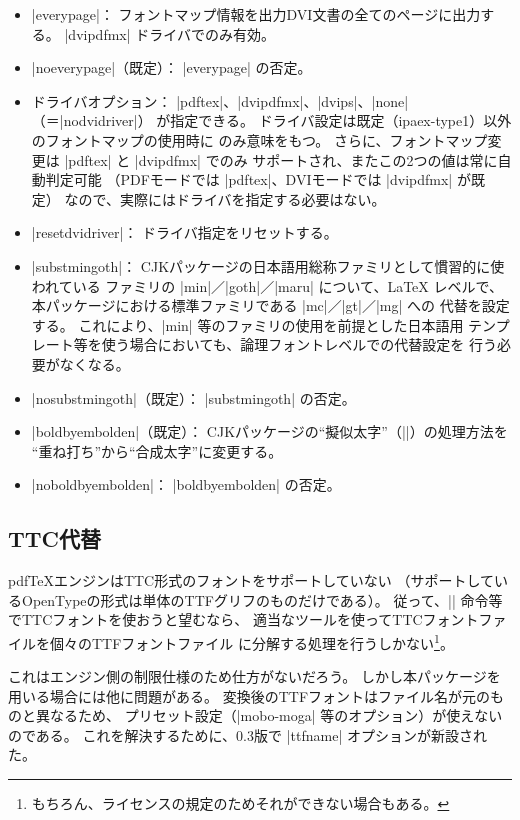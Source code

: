 \documentclass[a4paper]{ltjsarticle}
\newcommand{\Pkg}[1]{\textsf{#1}}
\newcommand{\Means}{：\quad}
\providecommand{\pdfTeX}{pdf\/\TeX}
\begin{document}
\begin{itemize}
\item |everypage|\Means
  フォントマップ情報を出力DVI文書の全てのページに出力する。
  |dvipdfmx| ドライバでのみ有効。
\item |noeverypage|（既定）\Means
  |everypage| の否定。
\item ドライバオプション\Means
  |pdftex|、|dvipdfmx|、|dvips|、|none|（＝|nodvidriver|）
  が指定できる。
  ドライバ設定は既定（ipaex-type1）以外のフォントマップの使用時に
  のみ意味をもつ。
  さらに、フォントマップ変更は |pdftex| と |dvipdfmx| でのみ
  サポートされ、またこの2つの値は常に自動判定可能
  （PDFモードでは |pdftex|、DVIモードでは |dvipdfmx| が既定）
  なので、実際にはドライバを指定する必要はない。
\item |resetdvidriver|\Means
  ドライバ指定をリセットする。
\item |substmingoth|\Means
  CJKパッケージの日本語用総称ファミリとして慣習的に使われている
  ファミリの |min|／|goth|／|maru| について、{\LaTeX} レベルで、
  本パッケージにおける標準ファミリである |mc|／|gt|／|mg| への
  代替を設定する。
  これにより、|min| 等のファミリの使用を前提とした日本語用
  テンプレート等を使う場合においても、論理フォントレベルでの代替設定を
  行う必要がなくなる。
\item |nosubstmingoth|（既定）\Means
  |substmingoth| の否定。
\item |boldbyembolden|（既定）\Means
  \Pkg{CJK}パッケージの“擬似太字”（|\CJKbold|）の処理方法を
  “重ね打ち”から“合成太字”に変更する。
\item |noboldbyembolden|\Means
  |boldbyembolden| の否定。
\end{itemize}

\subsection{TTC代替}
\label{ssec:ttfname}

{\pdfTeX}エンジンはTTC形式のフォントをサポートしていない
（サポートしているOpenTypeの形式は単体のTTFグリフのものだけである）。
従って、|\setminchofont| 命令等でTTCフォントを使おうと望むなら、
適当なツールを使ってTTCフォントファイルを個々のTTFフォントファイル
に分解する処理を行うしかない\footnote{%
もちろん、ライセンスの規定のためそれができない場合もある。}。

これはエンジン側の制限仕様のため仕方がないだろう。
しかし本パッケージを用いる場合には他に問題がある。
変換後のTTFフォントはファイル名が元のものと異なるため、
プリセット設定（|mobo-moga| 等のオプション）が使えないのである。
これを解決するために、0.3版で |ttfname| オプションが新設された。
\end{document}
